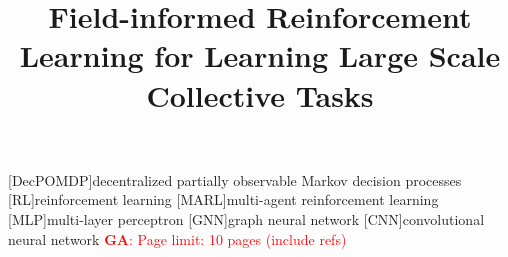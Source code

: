 \documentclass[conference]{IEEEtran}
\begin{document}
%
\title{Field-informed Reinforcement Learning for Learning Large Scale Collective Tasks} %
%

\author{

\and
{}
\and
{}
}
%
\maketitle              %
%

\newcommand{\meta}[3]{\textcolor{#1}{\textbf{#2}: #3}}
\newcommand{\ga}[1]{\meta{red}{GA}{#1}}
\newcommand{\lukas}[1]{\meta{purple}{Lukas}{#1}}
\newcommand{\mv}[1]{\meta{green}{MV}{#1}}
[DecPOMDP]{decentralized partially observable Markov decision processes}
[RL]{reinforcement learning}
[MARL]{multi-agent reinforcement learning}
[MLP]{multi-layer perceptron}
[GNN]{graph neural network}
[CNN]{convolutional neural network}
\ga{Page limit: 10 pages (include refs)}
\end{document}
